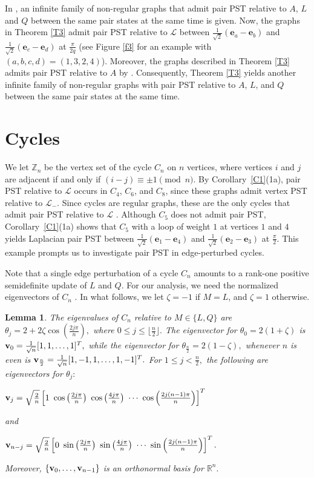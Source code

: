 \documentclass[12pt,a4paper]{article}
\newtheorem{lem}{Lemma}
\def \e {{\mathbf e}}
\def \v {{\bf v}}
\newcommand{\ob}[1]{\left(#1\right)}
\newcommand{\cb}[1]{\left\lbrace #1\right\rbrace}
\newcommand{\tb}[1]{\left[#1\right]}
\begin{document}
In \cite{pal9}, an infinite family of non-regular graphs that admit pair PST relative to $A$, $L$ and $Q$ between the same pair states at the same time is given. Now, the graphs in Theorem \ref{T3} admit pair PST relative to $\mathscr{L}$ between $\frac{1}{\sqrt{2}}\left( \mathbf{e}_a - \mathbf{e}_b \right)$ and $\frac{1}{\sqrt{2}}\left( \mathbf{e}_c - \mathbf{e}_d \right)$ at $\frac{\pi}{2q}$ (see Figure \ref{f3} for an example with $(a,b,c,d)=(1,3,2,4)$). Moreover, the graphs described in Theorem \ref{T3} admits pair PST relative to $A$ by \cite[Theorem 2]{pal7}. Consequently, Theorem \ref{T3} yields another infinite family of non-regular graphs with pair PST relative to $A$, $L$, and $Q$ between the same pair states at the same time.


\section{Cycles}
\label{sec4}

We let $\mathbb{Z}_n$ be the vertex set of the cycle $C_n$ on $n$ vertices, where vertices $i$ and $j$ are adjacent if and only if $ (i-j) \equiv \pm1 \pmod{n}$. 
By Corollary~\ref{C1}(1a), pair PST relative to $\mathscr{L}$ occurs in $C_4$, $C_6$, and $C_8$, since these graphs admit vertex PST relative to $\mathscr{L}_{-}$. Since cycles are regular graphs, these are the only cycles that admit pair PST relative to $\mathscr{L}$  \cite{kim}. Although $C_5$ does not admit pair PST, Corollary~\ref{C1}(1a) shows that $C_5$ with a loop of weight $1$ at vertices $1$ and $4$ yields Laplacian pair PST between $\frac{1}{\sqrt{2}}(\e_1 - \e_4)$ and $\frac{1}{\sqrt{2}}(\e_2 - \e_3)$ at $\frac{\pi}{2}$. This example prompts us to investigate pair PST in edge-perturbed cycles.

Note that a single edge perturbation of a cycle $C_n$ amounts to a rank-one positive semidefinite update of $L$ and $Q$. For our analysis, we need the normalized eigenvectors of $C_n$ \cite[Lemma 6.4]{god25}. In what follows, we let $\zeta = -1$ if $M=L$, and $\zeta = 1$ otherwise.

\begin{lem}\label{L3}
The eigenvalues of $C_n$ relative to $M\in\{L,Q\}$ are $\theta_j= 2+2\zeta\cos\ob{\frac{2j\pi}{n}},$ where $0 \leq j \leq \lfloor \frac{n}{2} \rfloor.$ The eigenvector for $\theta_0=2\ob{1+\zeta}$ is $\v_0= \frac{1}{\sqrt{n}}[1,1,\ldots,1]^T,$ while the eigenvector for $\theta_{\frac{n}{2}}=2\ob{1-\zeta},$ whenever $n$ is even is $\v_{\frac{n}{2}}=\frac{1}{\sqrt{n}}[1,-1,1,\ldots,1,-1]^T.$ For $1 \leq j < \frac{n}{2},$ the following are eigenvectors for $\theta_j:$
\begin{center}
$\v_j=\sqrt{\frac{2}{n}}\tb{1 ~\cos\ob{\frac{2j\pi}{n}} ~ \cos\ob{\frac{4j\pi}{n}} ~ \cdots~ \cos\ob{\frac{2j(n-1)\pi}{n}}}^T $
\end{center}
and
\begin{center}
$\v_{n-j}=\sqrt{\frac{2}{n}}\tb{0 ~\sin\ob{\frac{2j\pi}{n}} ~ \sin\ob{\frac{4j\pi}{n}} ~ \cdots~ \sin\ob{\frac{2j(n-1)\pi}{n}}}^T.$
\end{center}
Moreover, $\cb{\v_0,\ldots, \v_{n-1}}$ is an orthonormal basis for $\mathbb{R}^n.$
\end{lem}
\end{document}
